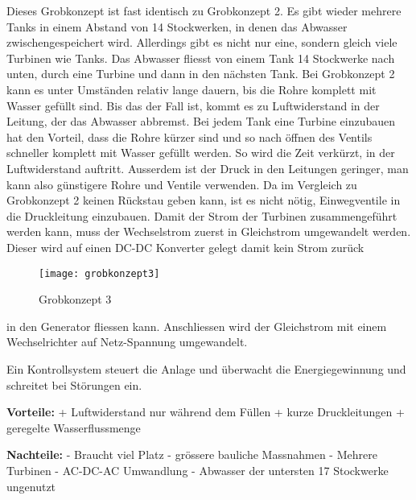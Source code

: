 Dieses Grobkonzept ist fast identisch zu Grobkonzept 2. Es gibt wieder mehrere Tanks in einem Abstand von 14 Stockwerken, in denen das Abwasser zwischengespeichert wird. Allerdings gibt es nicht nur eine, sondern gleich viele Turbinen wie Tanks. Das Abwasser fliesst von einem Tank 14 Stockwerke nach unten, durch eine Turbine und dann in den nächsten Tank. Bei Grobkonzept 2 kann es unter Umständen relativ lange dauern, bis die Rohre komplett mit Wasser gefüllt sind. Bis das der Fall ist, kommt es zu Luftwiderstand in der Leitung, der das Abwasser abbremst. Bei jedem Tank eine Turbine einzubauen hat den Vorteil, dass die Rohre kürzer sind und so nach öffnen des Ventils schneller komplett mit Wasser gefüllt werden. So wird die Zeit verkürzt, in der Luftwiderstand auftritt. Ausserdem ist der Druck in den Leitungen geringer, man kann also günstigere Rohre und Ventile verwenden. Da im Vergleich zu Grobkonzept 2 keinen Rückstau geben kann, ist es nicht nötig, Einwegventile in die Druckleitung einzubauen. 
Damit der Strom der Turbinen zusammengeführt werden kann, muss der Wechselstrom zuerst in Gleichstrom umgewandelt werden. Dieser wird auf einen DC-DC Konverter gelegt damit kein Strom zurück

\begin{wrapfigure}{r}{0.5\textwidth}
  \begin{center}
    \texttt{[image: grobkonzept3]}
  \end{center}
  \caption{Grobkonzept 3}
\end{wrapfigure}

in den Generator fliessen kann. Anschliessen wird der Gleichstrom mit einem Wechselrichter auf Netz-Spannung umgewandelt.

Ein Kontrollsystem steuert die Anlage und überwacht die Energiegewinnung und schreitet bei Störungen ein.

\textbf{Vorteile:} 									\newline
+	Luftwiderstand nur während dem Füllen			\newline
+	kurze Druckleitungen								\newline
+	geregelte Wasserflussmenge						\newline

\textbf{Nachteile:}									\newline
-	Braucht viel Platz								\newline
-	grössere bauliche Massnahmen						\newline
-	Mehrere Turbinen									\newline
-	AC-DC-AC Umwandlung								\newline
-	Abwasser der untersten 17 Stockwerke ungenutzt	\newline
\WFclear			
\newpage